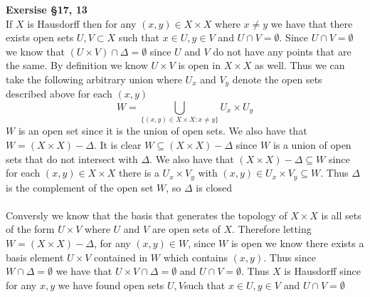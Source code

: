 \documentclass[12pt]{article}
\newenvironment{ques}[1]{\textbf{Exersise #1}\vspace{1 mm}\\ }{\bigskip}
\theoremstyle{definition}
\begin{document}
\begin{ques}{\S 17, 13}
	If $X$ is Hausdorff then for any $(x,y) \in X \times X$ where $x \neq y$ we
	have that there exists open sets $U, V \subset X$ such that $x \in U, y \in
	V$ and $U \cap V = \emptyset$. Since $U \cap V = \emptyset$ we know that
	$(U \times V)\cap \Delta = \emptyset$ since $U$ and $V$ do not have any
	points that are the same. By definition we know $U \times V$ is open in $X
	\times X$ as well. Thus we can take the following arbitrary union where $U_x$ and
	$V_y$ denote the open sets described above for each $(x,y)$
	$$W = \bigcup_{\{(x,y) \in X \times X: x \neq y\}} U_x \times U_y$$
	$W$ is an open set since it is the union of open sets. We also have that $W
	= (X \times X) - \Delta$. It is clear $W \subseteq (X \times X) - \Delta$
	since $W$ is a union of open sets that do not intersect with $\Delta$. We
	also have that $(X \times X) - \Delta \subseteq W$ since for each $(x, y)
	\in X \times X$ there is a $U_x \times V_y$ with $(x,y) \in U_x \times V_y
	\subseteq W$. Thus $\Delta$ is the complement of the open set $W$, so
	$\Delta$ is closed\\
	\\
	Conversly we know that the basis that generates the topology of $X \times
	X$ is all sets of the form $U \times V$ where $U$ and $V$ are open sets of
	$X$. Therefore letting $W = (X \times X) - \Delta$, for any $(x,y) \in W$,
	since $W$ is open we know there exists a basis element $U \times V$
	contained in $W$ which contains $(x,y)$. Thus since $W \cap \Delta =
	\emptyset$ we have that $U \times V \cap  \Delta = \emptyset$ and $U \cap V
	= \emptyset$. Thus $X$ is Hausdorff since for any $x,y$ we have found open
	sets $U, V$such that $x \in U, y \in V$ and $U \cap V = \emptyset$ 

\end{ques}
\end{document}

